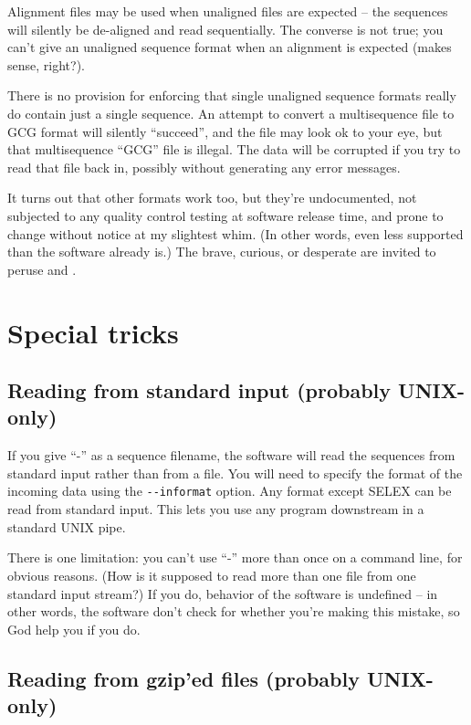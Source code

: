 Alignment files may be used when unaligned files are expected -- the
sequences will silently be de-aligned and read sequentially. The
converse is not true; you can't give an unaligned sequence format when
an alignment is expected (makes sense, right?).

There is no provision for enforcing that single unaligned sequence
formats really do contain just a single sequence.  An attempt to
convert a multisequence file to GCG format will silently ``succeed'',
and the file may look ok to your eye, but that multisequence ``GCG''
file is illegal. The data will be corrupted if you try to read that
file back in, possibly without generating any error messages.

It turns out that other formats work too, but they're undocumented,
not subjected to any quality control testing at software release time,
and prone to change without notice at my slightest whim. (In other
words, even less supported than the software already is.) The brave,
curious, or desperate are invited to peruse
 and .

\section{Special tricks}

\subsection{Reading from standard input (probably UNIX-only)}

If you give ``-'' as a sequence filename, the software will read the
sequences from standard input rather than from a file. You will need
to specify the format of the incoming data using the
\verb+--informat+ option.
Any format except SELEX can be read from standard input. This lets you
use any program downstream in a standard UNIX pipe.

There is one limitation: you can't use ``-'' more than once on a
command line, for obvious reasons. (How is it supposed to read more
than one file from one standard input stream?) If you do, behavior of
the software is undefined -- in other words, the software don't check
for whether you're making this mistake, so God help you if you do.

\subsection{Reading from gzip'ed files (probably UNIX-only)}

